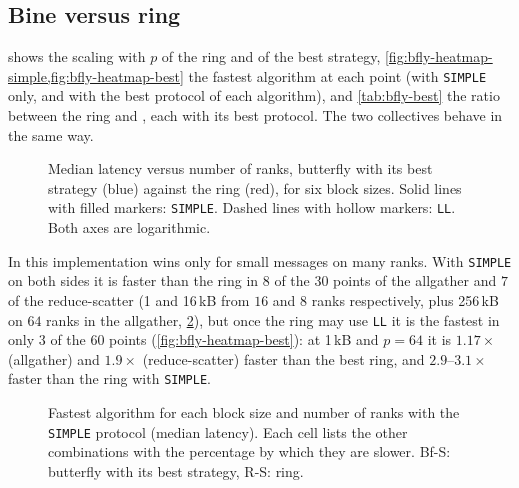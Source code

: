 \subsection{Bine versus ring}\label{sec:bfly-res-ring}

 shows the scaling with $p$ of the ring and of the best \bine{} strategy, \cref{fig:bfly-heatmap-simple,fig:bfly-heatmap-best} the fastest algorithm at each point (with \texttt{SIMPLE} only, and with the best protocol of each algorithm), and \cref{tab:bfly-best} the ratio between the ring and \bine{}, each with its best protocol.
The two collectives behave in the same way.

\begin{figure}[!tbp]
  \caption{Median latency versus number of ranks, \bine{} butterfly with its best strategy (blue) against the \nccl{} ring (red), for six block sizes. Solid lines with filled markers: \texttt{SIMPLE}. Dashed lines with hollow markers: \texttt{LL}. Both axes are logarithmic.}
  \label{fig:bfly-scaling}
\end{figure}

In this implementation \bine{} wins only for small messages on many ranks.
With \texttt{SIMPLE} on both sides it is faster than the ring in $8$ of the $30$ points of the allgather and $7$ of the reduce-scatter (1 and 16\,kB from $16$ and $8$ ranks respectively, plus 256\,kB on $64$ ranks in the allgather, \cref{fig:bfly-heatmap-simple}), but once the ring may use \texttt{LL} it is the fastest in only $3$ of the $60$ points (\cref{fig:bfly-heatmap-best}): at 1\,kB and $p=64$ it is $1.17\times$ (allgather) and $1.9\times$ (reduce-scatter) faster than the best ring, and $2.9$--$3.1\times$ faster than the ring with \texttt{SIMPLE}.

\begin{figure}[!tbp]
  \caption{Fastest algorithm for each block size and number of ranks with the \texttt{SIMPLE} protocol (median latency). Each cell lists the other combinations with the percentage by which they are slower. Bf-S: \bine{} butterfly with its best strategy, R-S: \nccl{} ring.}
  \label{fig:bfly-heatmap-simple}
\end{figure}

